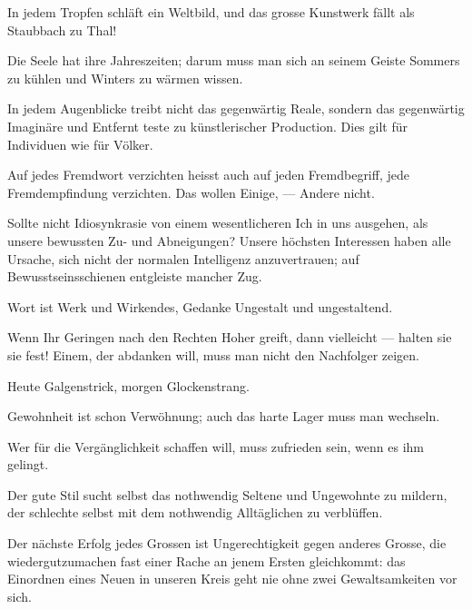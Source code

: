 In jedem Tropfen schläft ein Weltbild, und das grosse Kunstwerk fällt als Staubbach zu Thal!
\par

Die Seele hat ihre Jahreszeiten; darum muss man sich an seinem Geiste Sommers zu kühlen und Winters zu wärmen wissen.
\par

In jedem Augenblicke treibt nicht das gegenwärtig Reale, sondern das gegenwärtig Imaginäre und Entfernt teste zu künstlerischer Production. Dies gilt für Individuen wie für Völker.
\par

Auf jedes Fremdwort verzichten heisst auch auf jeden Fremdbegriff, jede Fremdempfindung verzichten. Das wollen Einige, — Andere nicht.
\par

Sollte nicht Idiosynkrasie von einem wesentlicheren Ich in uns ausgehen, als unsere bewussten Zu- und Abneigungen? Unsere höchsten Interessen haben alle Ursache, sich nicht der normalen Intelligenz anzuvertrauen; auf Bewusstseinsschienen entgleiste mancher Zug.
\par

Wort ist Werk und Wirkendes, Gedanke Ungestalt und ungestaltend.
\par

Wenn Ihr Geringen nach den Rechten Hoher greift, dann vielleicht — halten sie sie fest! Einem, der abdanken will, muss man nicht den Nachfolger zeigen.
\par

Heute Galgenstrick, morgen Glockenstrang.
\par

Gewohnheit ist schon Verwöhnung; auch das harte Lager muss man wechseln.
\par

Wer für die Vergänglichkeit schaffen will, muss zufrieden sein, wenn es ihm gelingt.
\par

Der gute Stil sucht selbst das nothwendig Seltene und Ungewohnte zu mildern, der schlechte selbst mit dem nothwendig Alltäglichen zu verblüffen.
\par

Der nächste Erfolg jedes Grossen ist Ungerechtigkeit gegen anderes Grosse, die wiedergutzumachen fast einer Rache an jenem Ersten gleichkommt: das Einordnen eines Neuen in unseren Kreis geht nie ohne zwei Gewaltsamkeiten vor sich.
\par

